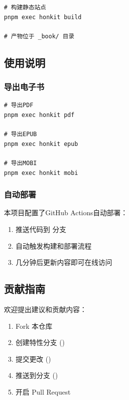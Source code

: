 \begin{lstlisting}[style=terminal]
# 构建静态站点
pnpm exec honkit build

# 产物位于 _book/ 目录
\end{lstlisting}

\hypertarget{ux4f7fux7528ux8bf4ux660e-1}{%
\subsection{使用说明}\label{ux4f7fux7528ux8bf4ux660e-1}}

\hypertarget{ux5bfcux51faux7535ux5b50ux4e66-1}{%
\subsubsection{导出电子书}\label{ux5bfcux51faux7535ux5b50ux4e66-1}}

\begin{lstlisting}[style=terminal]
# 导出PDF
pnpm exec honkit pdf

# 导出EPUB
pnpm exec honkit epub

# 导出MOBI
pnpm exec honkit mobi
\end{lstlisting}

\hypertarget{ux81eaux52a8ux90e8ux7f72-1}{%
\subsubsection{自动部署}\label{ux81eaux52a8ux90e8ux7f72-1}}

本项目配置了GitHub Actions自动部署：

\begin{enumerate}
\def\labelenumi{\arabic{enumi}.}
\tightlist
\item
  推送代码到  分支
\item
  自动触发构建和部署流程
\item
  几分钟后更新内容即可在线访问
\end{enumerate}

\hypertarget{ux8d21ux732eux6307ux5357-1}{%
\subsection{贡献指南}\label{ux8d21ux732eux6307ux5357-1}}

欢迎提出建议和贡献内容：

\begin{enumerate}
\def\labelenumi{\arabic{enumi}.}
\tightlist
\item
  Fork 本仓库
\item
  创建特性分支 ()
\item
  提交更改 ()
\item
  推送到分支 ()
\item
  开启 Pull Request
\end{enumerate}

